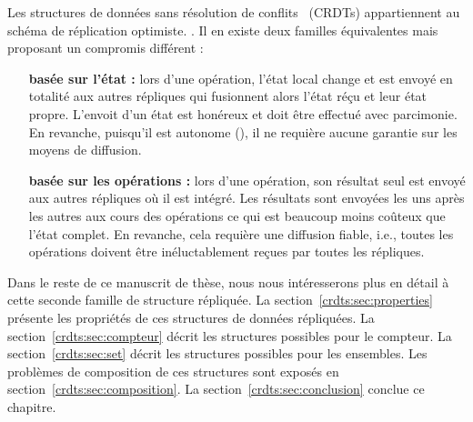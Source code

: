 Les structures de données sans résolution de
conflits~\cite{shapiro2011comprehensive} (CRDTs) appartiennent au schéma de
réplication optimiste. .  Il en existe deux
familles équivalentes mais proposant un compromis différent :
\begin{itemize}
\item [\textbf{basée sur l'état :}] lors d'une opération, l'état local change et
  est envoyé en totalité aux autres répliques qui fusionnent alors l'état réçu
  et leur état propre. L'envoit d'un état est honéreux et doit être effectué
  avec parcimonie. En revanche, puisqu'il est autonome
  (), il ne requière aucune garantie sur les moyens
  de diffusion.
\item [\textbf{basée sur les opérations :}] lors d'une opération, son résultat
  seul est envoyé aux autres répliques où il est intégré. Les résultats sont
  envoyées les uns après les autres aux cours des opérations ce qui est beaucoup
  moins coûteux que l'état complet. En revanche, cela requière une diffusion
  fiable, i.e., toutes les opérations doivent être inéluctablement reçues par
  toutes les répliques.
\end{itemize}

Dans le reste de ce manuscrit de thèse, nous nous intéresserons plus en détail à
cette seconde famille de structure répliquée. La
section~\ref{crdts:sec:properties} présente les propriétés de ces structures de
données répliquées. La section~\ref{crdts:sec:compteur} décrit les structures
possibles pour le compteur. La section~\ref{crdts:sec:set} décrit les structures
possibles pour les ensembles. Les problèmes de composition de ces structures
sont exposés en section~\ref{crdts:sec:composition}. La
section~\ref{crdts:sec:conclusion} conclue ce chapitre.

